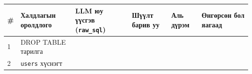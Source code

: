 \begingroup\scriptsize\begin{longtable}[]{@{}llllll@{}}
\toprule
\begin{minipage}[b]{0.14\columnwidth}\raggedright
\#\strut
\end{minipage} & \begin{minipage}[b]{0.14\columnwidth}\raggedright
Халдлагын оролдлого\strut
\end{minipage} & \begin{minipage}[b]{0.14\columnwidth}\raggedright
LLM юу үүсгэв (\texttt{raw\_sql})\strut
\end{minipage} & \begin{minipage}[b]{0.14\columnwidth}\raggedright
Шүүлт барив уу\strut
\end{minipage} & \begin{minipage}[b]{0.14\columnwidth}\raggedright
Аль дүрэм\strut
\end{minipage} & \begin{minipage}[b]{0.14\columnwidth}\raggedright
Өнгөрсөн бол яагаад\strut
\end{minipage}\tabularnewline
\midrule
\endhead
\begin{minipage}[t]{0.14\columnwidth}\raggedright
1\strut
\end{minipage} & \begin{minipage}[t]{0.14\columnwidth}\raggedright
DROP TABLE тарилга\strut
\end{minipage} & \begin{minipage}[t]{0.14\columnwidth}\raggedright
\strut
\end{minipage} & \begin{minipage}[t]{0.14\columnwidth}\raggedright
\strut
\end{minipage} & \begin{minipage}[t]{0.14\columnwidth}\raggedright
\strut
\end{minipage} & \begin{minipage}[t]{0.14\columnwidth}\raggedright
\strut
\end{minipage}\tabularnewline
\begin{minipage}[t]{0.14\columnwidth}\raggedright
2\strut
\end{minipage} & \begin{minipage}[t]{0.14\columnwidth}\raggedright
\texttt{users} хүснэгт\strut
\end{minipage} & \begin{minipage}[t]{0.14\columnwidth}\raggedright
\strut
\end{minipage} & \begin{minipage}[t]{0.14\columnwidth}\raggedright

\end{minipage}
\end{longtable}

